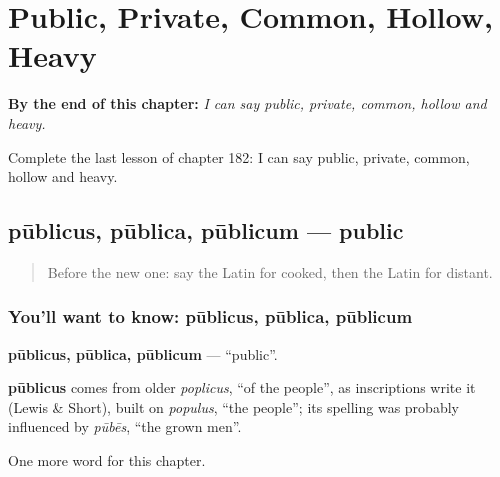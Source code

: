 
\chapter{Public, Private, Common, Hollow, Heavy}
\label{ch:la-public-private-common-hollow-heavy}

\begin{chapteropening}
\textbf{By the end of this chapter:} \emph{I can say public, private, common, hollow and heavy.}

Complete the last lesson of chapter 182: I can say public, private, common, hollow and heavy.
\end{chapteropening}

\section[pūblicus, pūblica, pūblicum]{pūblicus, pūblica, pūblicum — public}

\label{lesson:LA-C182-publicus}



\begin{quote}
Before the new one: say the Latin for cooked, then the Latin for distant.
\end{quote}

\subsection*{You'll want to know: pūblicus, pūblica, pūblicum}
\textbf{pūblicus, pūblica, pūblicum} — \textquotedblleft{}public\textquotedblright{}.

\begin{cousinweb}
\textbf{pūblicus} comes from older \emph{poplicus}, \textquotedblleft{}of the people\textquotedblright{}, as inscriptions write it (Lewis \& Short), built on \emph{populus}, \textquotedblleft{}the people\textquotedblright{}; its spelling was probably influenced by \emph{pūbēs}, \textquotedblleft{}the grown men\textquotedblright{}.
\end{cousinweb}

\begin{grammarlens}[title={What you've built}]
One more word for this chapter.
\end{grammarlens}

